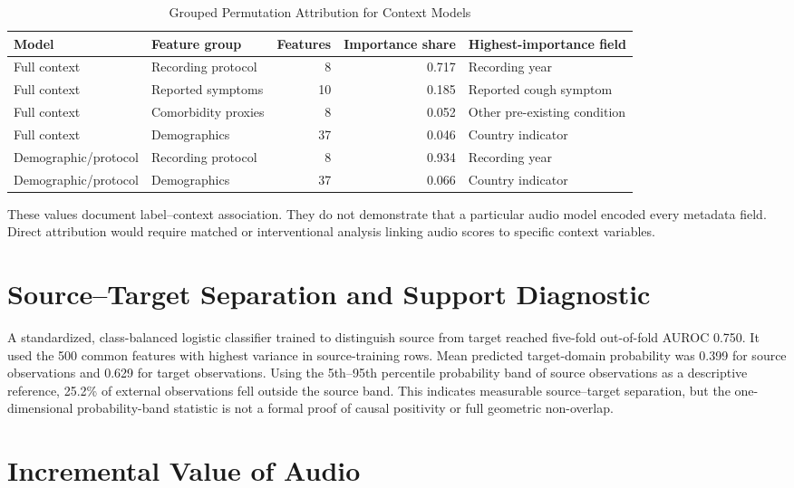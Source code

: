 \documentclass[journal]{IEEEtran}
\begin{document}
\begin{table}[t]
\caption{Grouped Permutation Attribution for Context Models}
\label{tab:s_context}
\centering
\footnotesize
\begin{tabular}{llrrl}
\toprule
Model & Feature group & Features & Importance share & Highest-importance field \\
\midrule
Full context & Recording protocol & 8 & 0.717 & Recording year \\
Full context & Reported symptoms & 10 & 0.185 & Reported cough symptom \\
Full context & Comorbidity proxies & 8 & 0.052 & Other pre-existing condition \\
Full context & Demographics & 37 & 0.046 & Country indicator \\
Demographic/protocol & Recording protocol & 8 & 0.934 & Recording year \\
Demographic/protocol & Demographics & 37 & 0.066 & Country indicator \\
\bottomrule
\end{tabular}
\end{table}

These values document label--context association. They do not demonstrate that a particular audio model encoded every metadata field. Direct attribution would require matched or interventional analysis linking audio scores to specific context variables.

\section{Source--Target Separation and Support Diagnostic}

A standardized, class-balanced logistic classifier trained to distinguish source from target reached five-fold out-of-fold AUROC 0.750. It used the 500 common features with highest variance in source-training rows. Mean predicted target-domain probability was 0.399 for source observations and 0.629 for target observations. Using the 5th--95th percentile probability band of source observations as a descriptive reference, 25.2\% of external observations fell outside the source band. This indicates measurable source--target separation, but the one-dimensional probability-band statistic is not a formal proof of causal positivity or full geometric non-overlap.

\section{Incremental Value of Audio}
\end{document}
